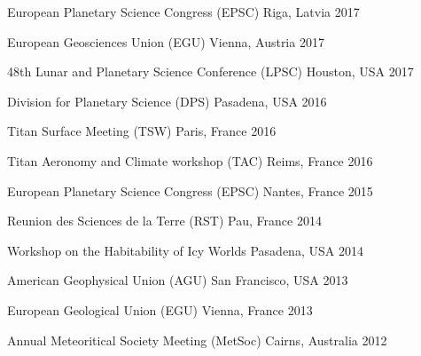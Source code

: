 
\begin{cvhonors}

  \cvhonor
    {European Planetary Science Congress (EPSC)}
    {}
    {Riga, Latvia}
    {2017}

  \cvhonor
    {European Geosciences Union (EGU)}
    {}
    {Vienna, Austria}
    {2017}

  \cvhonor
    {48th Lunar and Planetary Science Conference (LPSC)}
    {}
    {Houston, USA}
    {2017}

  \cvhonor
    {Division for Planetary Science (DPS)}
    {}
    {Pasadena, USA}
    {2016}

  \cvhonor
    {Titan Surface Meeting (TSW)}
    {}
    {Paris, France}
    {2016}

  \cvhonor
    {Titan Aeronomy and Climate workshop (TAC)}
    {}
    {Reims, France}
    {2016}

  \cvhonor
    {European Planetary Science Congress (EPSC)}
    {}
    {Nantes, France}
    {2015}

  \cvhonor
    {Reunion des Sciences de la Terre (RST)}
    {}
    {Pau, France}
    {2014}

  \cvhonor
    {Workshop on the Habitability of Icy Worlds}
    {}
    {Pasadena, USA}
    {2014}

  \cvhonor
    {American Geophysical Union (AGU)}
    {}
    {San Francisco, USA}
    {2013}

  \cvhonor
    {European Geological Union (EGU)}
    {}
    {Vienna, France}
    {2013}

  \cvhonor
    {Annual Meteoritical Society Meeting (MetSoc)}
    {}
    {Cairns, Australia}
    {2012}


\end{cvhonors}
